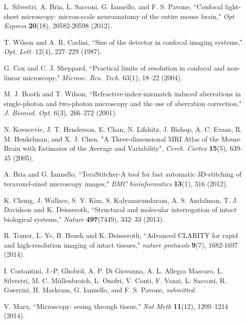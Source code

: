\documentclass[12pt]{spieman}  %
\begin{document}
\begin{thebibliography}{0}
 L. Silvestri, A. Bria, L. Sacconi, G. Iannello,  and F. S. Pavone,  ``Confocal light-sheet microscopy: micron-scale neuroanatomy of the entire mouse brain," \emph{Opt Express} \textbf{20}(18), 20582-20598 (2012).

 T. Wilson and A. R. Carlini, ``Size of the detector in confocal imaging systems," \emph{Opt. Lett.} 12(4), 227–229 (1987).

 G. Cox and C. J. Sheppard, ``Practical limits of resolution in confocal and non-linear microscopy," \emph{Microsc. Res. Tech.} 63(1), 18–22 (2004).

 M. J. Booth and T. Wilson, ``Refractive-index-mismatch induced aberrations in single-photon and two-photon microscopy and the use of aberration correction," \emph{J. Biomed. Opt.} 6(3), 266–272 (2001).


 N. Kovacevic, J. T. Henderson, E. Chan, N. Lifshitz, J. Bishop, A. C. Evans, R. M. Henkelman, and X. J. Chen, "A Three-dimensional MRI Atlas of the Mouse Brain with Estimates of the Average and Variability", \emph{Cereb. Cortex} \textbf{15}(5), 639-45 (2005).

 A. Bria and G. Iannello,  ``TeraStitcher-A tool for fast automatic 3D-stitching of teravoxel-sized microscopy images,"  \emph{BMC bioinformatics} \textbf{13}(1), 316 (2012).

 K. Chung, J. Wallace, S. Y. Kim, S. Kalyanasundaram, A. S. Andalman, T. J. Davidson and K. Deisseroth, ``Structural and molecular interrogation of intact biological systems," \emph{Nature} \textbf{497}(7449), 332–33 (2013).

 R. Tomer, L. Ye, B. Hsueh and K. Deisseroth, ``Advanced CLARITY for rapid and high-resolution imaging of intact tissues," \emph{nature protocols} \textbf{9}(7), 1682-1697 (2014).

 I. Costantini, J.-P. Ghobril, A. P. Di Giovanna, A. L. Allegra Mascaro, L. Silvestri, M. C. M\"{u}llenbroich, L. Onofri, V. Conti, F. Vanzi, L. Sacconi, R. Guerrini, H. Markram, G. Iannello, and F. S. Pavone, \emph{submitted}.

 V. Marx, ``Microscopy: seeing through tissue," \emph{Nat Meth} \textbf{11}(12), 1209–1214 (2014).


\end{thebibliography}
\end{document}
